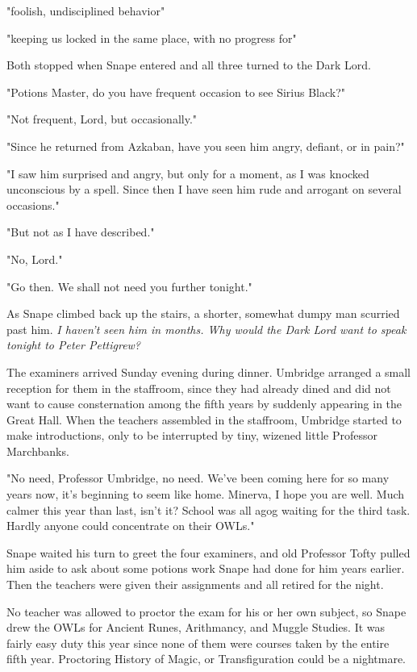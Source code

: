 "{\el}foolish, undisciplined behavior{\el}"

"{\el}keeping us locked in the same place, with no progress for{\el}"

Both stopped when Snape entered and all three turned to the Dark Lord.

"Potions Master, do you have frequent occasion to see Sirius Black?"

"Not frequent, Lord, but occasionally."

"Since he returned from Azkaban, have you seen him angry, defiant, or in pain?"

"I saw him surprised and angry, but only for a moment, as I was knocked unconscious by a spell. Since then I have seen him rude and arrogant on several occasions."

"But not as I have described."

"No, Lord."

"Go then. We shall not need you further tonight."

As Snape climbed back up the stairs, a shorter, somewhat dumpy man scurried past him. \emph{I haven't seen him in months. Why would the Dark Lord want to speak tonight to Peter Pettigrew?}

The examiners arrived Sunday evening during dinner. Umbridge arranged a small reception for them in the staffroom, since they had already dined and did not want to cause consternation among the fifth years by suddenly appearing in the Great Hall. When the teachers assembled in the staffroom, Umbridge started to make introductions, only to be interrupted by tiny, wizened little Professor Marchbanks.

"No need, Professor Umbridge, no need. We've been coming here for so many years now, it's beginning to seem like home. Minerva, I hope you are well. Much calmer this year than last, isn't it? School was all agog waiting for the third task. Hardly anyone could concentrate on their OWLs."

Snape waited his turn to greet the four examiners, and old Professor Tofty pulled him aside to ask about some potions work Snape had done for him years earlier. Then the teachers were given their assignments and all retired for the night.

No teacher was allowed to proctor the exam for his or her own subject, so Snape drew the OWLs for Ancient Runes, Arithmancy, and Muggle Studies. It was fairly easy duty this year since none of them were courses taken by the entire fifth year. Proctoring History of Magic, or Transfiguration could be a nightmare.

